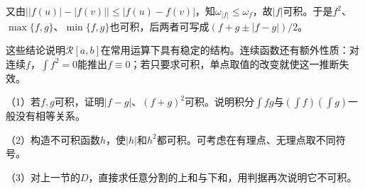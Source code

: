 又由\(\bigl||f(u)|-|f(v)|\bigr|\le|f(u)-f(v)|\)，知\(\omega_{|f|}\le\omega_f\)，故\(|f|\)可积。于是\(f^2\)、\(\max\{f,g\}\)、\(\min\{f,g\}\)也可积，后两者可写成\((f+g\pm|f-g|)/2\)。

这些结论说明\(\mathcal R[a,b]\)在常用运算下具有稳定的结构。连续函数还有额外性质：对连续\(f\)，\(\int f^2=0\)能推出\(f\equiv0\)；若只要求可积，单点取值的改变就使这一推断失效。

\begin{exercise}
\mbox{}\par\nobreak

（1）若\(f,g\)可积，证明\(|f-g|\)、\((f+g)^2\)可积。说明积分\(\int fg\)与\((\int f)(\int g)\)一般没有相等关系。

（2）构造不可积函数\(h\)，使\(|h|\)和\(h^2\)都可积。可考虑在有理点、无理点取不同符号。

（3）对上一节的\(D\)，直接求任意分割的上和与下和，用判据再次说明它不可积。
\end{exercise}
